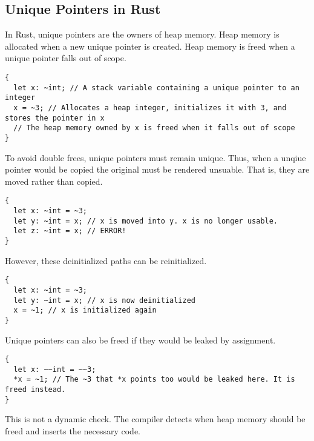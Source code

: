 \subsection*{Unique Pointers in Rust}
In Rust, unique pointers are the owners of heap memory.
Heap memory is allocated when a new unique pointer is created.
Heap memory is freed when a unique pointer falls out of scope.
\begin{verbatim}
{
  let x: ~int; // A stack variable containing a unique pointer to an integer
  x = ~3; // Allocates a heap integer, initializes it with 3, and stores the pointer in x
  // The heap memory owned by x is freed when it falls out of scope
}
\end{verbatim}

To avoid double frees, unique pointers must remain unique.
Thus, when a unqiue pointer would be copied the original must be rendered unsuable.
That is, they are moved rather than copied.
\begin{verbatim}
{
  let x: ~int = ~3;
  let y: ~int = x; // x is moved into y. x is no longer usable.
  let z: ~int = x; // ERROR!
}
\end{verbatim}

However, these deinitialized paths can be reinitialized.
\begin{verbatim}
{
  let x: ~int = ~3;
  let y: ~int = x; // x is now deinitialized
  x = ~1; // x is initialized again
}
\end{verbatim}

Unique pointers can also be freed if they would be leaked by assignment.
\begin{verbatim}
{
  let x: ~~int = ~~3;
  *x = ~1; // The ~3 that *x points too would be leaked here. It is freed instead.
}
\end{verbatim}

This is not a dynamic check. 
The compiler detects when heap memory should be freed and inserts the necessary code.

